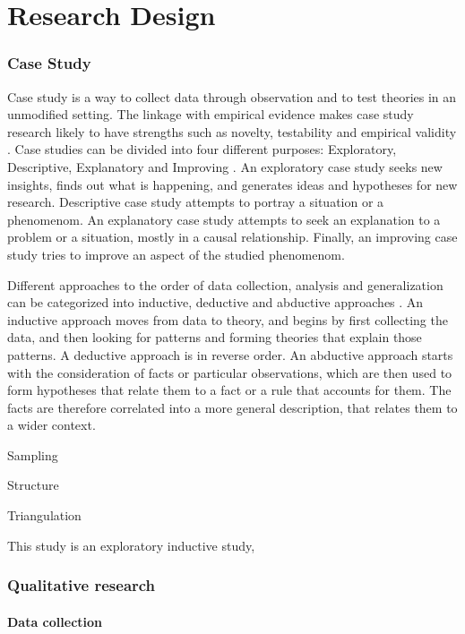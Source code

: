 \chapter{Research Design}
\label{chapter:methods} 

\subsection{Case Study}
Case study is a way to collect data through observation and to test theories in an unmodified setting. The linkage with empirical evidence makes case study research likely to have strengths such as novelty, testability and empirical validity \cite{eisenhardt1989building}. Case studies can be divided into four different purposes: Exploratory, Descriptive, Explanatory and Improving \cite{robson2016real}. An exploratory case study seeks new insights, finds out what is happening, and generates ideas and hypotheses for new research. Descriptive case study attempts to portray a situation or a phenomenom. An explanatory case study attempts to seek an explanation to a problem or a situation, mostly in a causal relationship. Finally, an improving case study tries to improve an aspect of the studied phenomenom.

Different approaches to the order of data collection, analysis and generalization can be categorized into inductive, deductive and abductive approaches \cite{dubois2002systematic}. An inductive approach moves from data to theory, and begins by first collecting the data, and then looking for patterns and forming theories that explain those patterns. A deductive approach is in reverse order. An abductive approach starts with the consideration of facts or particular observations, which are then used to form hypotheses that relate them to a fact or a rule that accounts for them. The facts are therefore correlated into a more general description, that relates them to a wider context.

Sampling

Structure \cite{eisenhardt1989building}

Triangulation

This study is an exploratory inductive study, 

\subsection{Qualitative research}




\subsubsection{Data collection}

